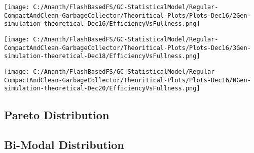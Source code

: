 \begin{SCfigure}
	\texttt{[image: C:/Ananth/FlashBasedFS/GC-StatisticalModel/Regular-CompactAndClean-GarbageCollector/Theoritical-Plots/Plots-Dec16/2Gen-simulation-theoretical-Dec16/EfficiencyVsFullness.png]}
\end{SCfigure}

\begin{SCfigure}
	\texttt{[image: C:/Ananth/FlashBasedFS/GC-StatisticalModel/Regular-CompactAndClean-GarbageCollector/Theoritical-Plots/Plots-Dec16/3Gen-simulation-theoretical-Dec18/EfficiencyVsFullness.png]}
\end{SCfigure}

\begin{SCfigure}
	\texttt{[image: C:/Ananth/FlashBasedFS/GC-StatisticalModel/Regular-CompactAndClean-GarbageCollector/Theoritical-Plots/Plots-Dec16/NGen-simulation-theoretical-Dec20/EfficiencyVsFullness.png]}
\end{SCfigure}


\subsection{Pareto Distribution}


\subsection{Bi-Modal Distribution}




